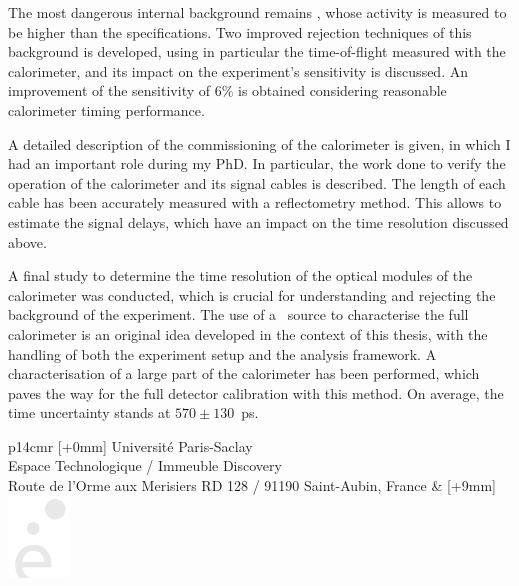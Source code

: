 \begin{mdframed}[linecolor=Prune,linewidth=1]
\begin{footnotesize}
\begin{multicols}{2}
The most dangerous internal background remains \Tl, whose activity is measured to be higher than the specifications.
Two improved rejection techniques of this background is developed, using in particular the time-of-flight measured with the calorimeter, and its impact on the experiment's sensitivity is discussed.
An improvement of the sensitivity of $6$\% is obtained considering reasonable calorimeter timing performance.

A detailed description of the commissioning of the calorimeter is given, in which I had an important role during my PhD.
In particular, the work done to verify the operation of the calorimeter and its signal cables is described.
The length of each cable has been accurately measured with a reflectometry method.
This allows to estimate the signal delays, which have an impact on the time resolution discussed above.

A final study to determine the time resolution of the optical modules of the calorimeter was conducted, which is crucial for understanding and rejecting the background of the experiment.
The use of a \Co\ source to characterise the full calorimeter is an original idea developed in the context of this thesis, with the handling of both the experiment setup and the analysis framework.
A characterisation of a large part of the calorimeter has been performed, which paves the way for the full detector calibration with this method.
On average, the time uncertainty stands at $570\pm 130$~ps.


\end{multicols}
\end{footnotesize}
\end{mdframed}

\vspace{3cm} %

\selectfont
\begin{tabular}{p{14cm}r}
[+0mm]{{\color{Prune} Université Paris-Saclay\\
Espace Technologique / Immeuble Discovery\\
Route de l’Orme aux Merisiers RD 128 / 91190 Saint-Aubin, France}} & [+9mm]{\includegraphics[height=2.19cm]{Abstract/e.pdf}}
\\
\end{tabular}
